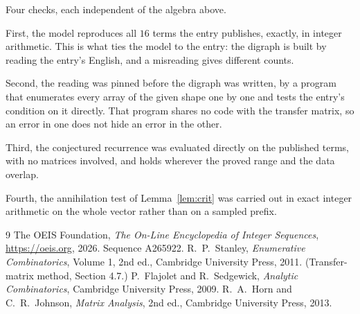 \documentclass[11pt,a4paper]{article}
\theoremstyle{plain}
\theoremstyle{definition}
\begin{document}
Four checks, each independent of the algebra above.

First, the model reproduces all $16$ terms the entry publishes, exactly, in integer
arithmetic. This is what ties the model to the entry: the digraph is built by reading the
entry's English, and a misreading gives different counts.

Second, the reading was pinned before the digraph was written, by a program that enumerates
every array of the given shape one by one and tests the entry's condition on it directly. That program shares no code with the transfer matrix, so an error in one does not
hide an error in the other.

Third, the conjectured recurrence was evaluated directly on the published terms, with no
matrices involved, and holds wherever the proved range and the data overlap.

Fourth, the annihilation test of Lemma~\ref{lem:crit} was carried out in exact integer
arithmetic on the whole vector rather than on a sampled prefix.

\begin{thebibliography}{9}
 The OEIS Foundation, \emph{The On-Line Encyclopedia of Integer
Sequences}, \url{https://oeis.org}, 2026. Sequence A265922.
 R.~P.~Stanley, \emph{Enumerative Combinatorics}, Volume 1, 2nd ed.,
Cambridge University Press, 2011. (Transfer-matrix method, Section 4.7.)
 P.~Flajolet and R.~Sedgewick, \emph{Analytic Combinatorics}, Cambridge
University Press, 2009.
 R.~A.~Horn and C.~R.~Johnson, \emph{Matrix Analysis}, 2nd ed., Cambridge
University Press, 2013.
\end{thebibliography}
\end{document}
